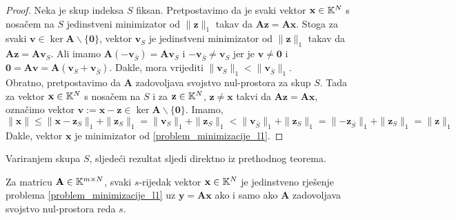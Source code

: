 \documentclass[a4paper,twoside,12pt]{memoir} %
\newcommand{\vect}[1]{\mathbf{#1}}
\renewcommand{\vec}{\vect}
\newcommand{\norm}[1]{\|{#1}\|}
\begin{document}
\begin{proof}
    Neka je skup indeksa $S$ fiksan. Pretpostavimo da je svaki vektor $\vec x \in \K^N$ s nosa\v{c}em na $S$ jedinstveni minimizator od $\norm{\vec z}_1$ takav da $\vec {Az} = \vec {Ax}$. Stoga za svaki $\vec v \in \ker \vec A \backslash \{\vec 0\}$, vektor $\vec v_S$ je jedinstveni minimizator od $\norm{\vec z}_1$ takav da $\vec{Az} = \vec{Av}_S$. Ali imamo $\vec A (-\vec v_{\bar S}) = \vec A \vec v_S$ i $-\vec v_{\bar S} \neq \vec v_S$ jer je $\vec v \neq \vec 0$ i $ \vec 0 = \vec{Av} = \vec A (\vec v_S + \vec v_{\bar S})$. Dakle, mora vrijediti $\norm{\vec v_S}_1 < \norm{\vec v_{\bar S}}_1$.\\
\indent
Obratno, pretpostavimo da $\vec A$ zadovoljava svojstvo nul-prostora za skup $S$. Tada za vektor $\vec x \in \K^N$ s nosa\v{c}em na $S$ i za $\vec z \in \K^N$, $\vec z \neq \vec x$ takvi da $\vec{Az}=\vec{Ax}$, ozna\v{c}imo vektor $\vec v := \vec x - \vec z \in \ker \vec A \backslash \{\vec 0\}$. Imamo,
\begin{equation*}
    \norm{\vec x} \leq \norm{\vec x - \vec z_S}_1 + \norm{\vec z_S}_1 = \norm{\vec v_S}_1 + \norm{\vec z_S}_1 < \norm{\vec v_{\bar S}}_1 + \norm{\vec z_S}_1 = \norm{- \vec z_{\bar S}}_1 + \norm{\vec z_S}_1 = \norm{\vec z}_1
\end{equation*}
Dakle, vektor $\vec x$ je minimizator od \eqref{problem_minimizacije_l1}.
\end{proof}

\indent
Variranjem skupa $S$, sljede\'ci rezultat sljedi direktno iz prethodnog teorema. 

\begin{thm}\label{svojstvo_nul_prostora_tm}
    Za matricu $\vec A \in \K^{m \times N}$, svaki $s$-rijedak vektor $\vec x \in \K^N$ je jedinstveno rje\v{s}enje problema \eqref{problem_minimizacije_l1} uz $\vec y = \vec{Ax}$ ako i samo ako $\vec A$ zadovoljava svojstvo nul-prostora reda $s$.
\end{thm}
\end{document}
